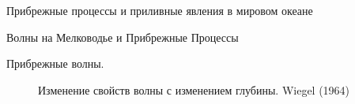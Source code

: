 \begin{chapter}{Прибрежные процессы и приливные явления в мировом океане}
\begin{section}{Волны на Мелководье и Прибрежные Процессы}
\begin{paragraph}{Прибрежные волны.}
\begin{figure}[t!]
\caption{Изменение свойств волны с изменением глубины. Wiegel (1964)}
\label{wiegelgraph}
\end{figure}
%
%


\end{paragraph}
\end{section}
\end{chapter}
